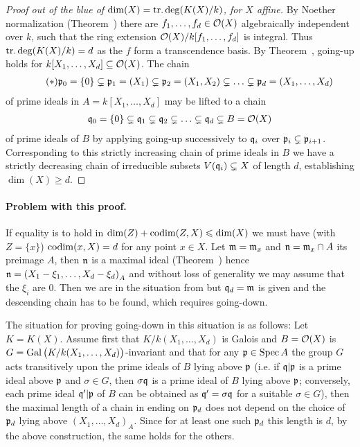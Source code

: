 \documentclass[a4paper,parskip=half,numbers=enddot, DIV=12]{scrreprt}
\renewcommand{\geq}{\geqslant}
\renewcommand{\leq}{\leqslant}
\begin{document}
	\begin{proof}[Proof out of the blue of $\dim (X) = \operatorname{tr.deg} (K(X)/k)$, for $X$ affine]
		By Noether normalization (Theorem~) there are $f_1,\ldots, f_d\in \mathcal{O}(X)$ algebraically independent over $k$, such that the ring extension $\mathcal{O}(X)/k[f_1,\ldots,f_d]$ is integral. Thus $\operatorname{tr.deg} (K(X)/k) = d$ as the $f$ form a transcendence basis. By Theorem~, going-up holds for $k[X_1,\ldots, X_d]\subseteq \mathcal{O}(X)$. The chain 
		\begin{align*}\lbl{eq:idealchain}\tag{$*$}
			\pp_0=\{0\} \subsetneq \pp_1 = (X_1)\subsetneq \pp_2=(X_1,X_2)\subsetneq\ldots\subsetneq \pp_d = (X_1,\ldots, X_d)
		\end{align*}
		of prime ideals in $A = k[X_1,\ldots, X_d]$ may be lifted to a chain
		\begin{align*}
			\mathfrak{q}_0 = \{0\}\subsetneq \mathfrak{q}_1\subsetneq\mathfrak{q}_2\subsetneq\ldots\subsetneq \mathfrak{q}_d \subsetneq B = \mathcal{O}(X)
		\end{align*}
		of prime ideals of $B$ by applying going-up successively to $\mathfrak{q}_i$ over $\mathfrak{p}_i\subsetneq \mathfrak{p}_{i+1}$. Corresponding to this strictly increasing chain of prime ideals in $B$ we have a strictly decreasing chain of irreducible subsets $V(\mathfrak{q}_i)\subsetneq X$ of length $d$, establishing $\dim (X)\geq d$.
	\end{proof}
	\paragraph{Problem with this proof.}
	If equality is to hold in $\dim (Z) +\codim(Z,X)\leq \dim (X)$ we must have (with $Z=\{x\}$) $\operatorname{codim}(x,X) = d$ for any point $x\in X$. Let $\mathfrak{m} = \mathfrak{m}_x$ and $\mathfrak{n} = \mathfrak{m}_x\cap A$ its preimage $A$, then $\mathfrak{n}$ is a maximal ideal (Theorem~) hence $\mathfrak{n} = \left(X_1-\xi_1,\ldots, X_d-\xi_d\right)_A$ and without loss of generality we may assume that the $\xi_i$ are 0. Then we are in the situation from  but $\mathfrak{q}_d = \mathfrak{m}$ is given and the descending chain has to be found, which requires going-down. 
	
	The situation for proving going-down in this situation is as follows: Let $K=K(X)$. Assume first that $K/k(X_1,\ldots,X_d)$ is Galois and $B=\mathcal{O}(X)$ is $G=\operatorname{Gal}\big(K/k(X_1,\ldots,X_d)\big)$-invariant and that for any $\mathfrak{p}\in\operatorname{Spec} A$ the group $G$ acts transitively upon the prime ideals of $B$ lying above $\mathfrak{p}$ (i.e. if $\mathfrak{q}|\mathfrak{p}$ is a prime ideal above $\mathfrak{p}$ and  $\sigma\in G$, then $\sigma\mathfrak{q}$ is a prime ideal of $B$ lying above $\mathfrak{p}$; conversely, each prime ideal $\mathfrak{q}'|\mathfrak{p}$ of $B$ can be obtained as $\mathfrak{q}'=\sigma\mathfrak{q}$ for a suitable $\sigma\in G$), then the maximal length of a chain in  ending on $\mathfrak{p}_d$ does not depend on the choice of $\mathfrak{p}_d$ lying above $\left(X_1,\ldots, X_d\right)_A$. Since for at least one such $\mathfrak{p}_d$ this length is $d$, by the above construction, the same holds for the others.
	
\end{document}

